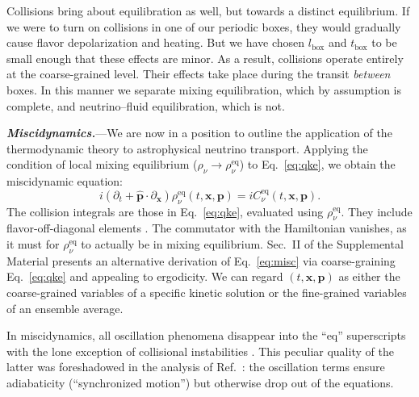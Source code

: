 \documentclass[aps,prl,twocolumn,groupedaddress]{revtex4-2}
\begin{document}
Collisions bring about equilibration as well, but towards a distinct equilibrium. If we were to turn on collisions in one of our periodic boxes, they would gradually cause flavor depolarization and heating. But we have chosen $l_\textrm{box}$ and $t_\textrm{box}$ to be small enough that these effects are minor. As a result, collisions operate entirely at the coarse-grained level. Their effects take place during the transit \textit{between} boxes. In this manner we separate mixing equilibration, which by assumption is complete, and neutrino--fluid equilibration, which is not.


















\textbf{\textit{Miscidynamics.}}---We are now in a position to outline the application of the thermodynamic theory to astrophysical neutrino transport. Applying the condition of local mixing equilibrium ($\rho_\nu \rightarrow \rho_\nu^\textrm{eq}$) to Eq.~\eqref{eq:qke}, we obtain the miscidynamic equation:
\begin{equation}
i \left( \partial_t + \boldsymbol{\hat{p}} \cdot \partial_{\boldsymbol{x}} \right) \rho_\nu^\textrm{eq} (t, \boldsymbol{x}, \boldsymbol{p}) = iC_\nu^\textrm{eq} (t, \boldsymbol{x}, \boldsymbol{p}). \label{eq:misc}
\end{equation}
The collision integrals are those in Eq.~\eqref{eq:qke}, evaluated using $\rho_\nu^\textrm{eq}$. They include flavor-off-diagonal elements \cite{blaschke2016, richers2019}. The commutator with the Hamiltonian vanishes, as it must for $\rho_\nu^\textrm{eq}$ to actually be in mixing equilibrium. Sec.~II of the Supplemental Material presents an alternative derivation of Eq.~\eqref{eq:misc} via coarse-graining Eq.~\eqref{eq:qke} and appealing to ergodicity. We can regard $(t, \boldsymbol{x}, \boldsymbol{p})$ as either the coarse-grained variables of a specific kinetic solution or the fine-grained variables of an ensemble average.

In miscidynamics, all oscillation phenomena disappear into the ``eq'' superscripts with the lone exception of collisional instabilities \cite{johns2023, johns2022, johns2022b, padillagay2022b, lin2023, xiong2023, xiong2022b, liu2023}. This peculiar quality of the latter was foreshadowed in the analysis of Ref.~\cite{johns2023}: the oscillation terms ensure adiabaticity (``synchronized motion'') but otherwise drop out of the equations.
\end{document}
